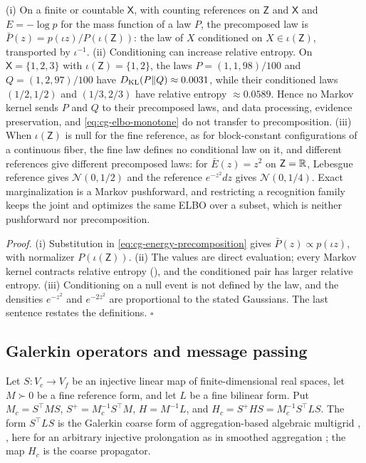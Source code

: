 (i) On a finite or countable $\mathsf X$, with counting references on $\mathsf Z$ and $\mathsf X$
and $E=-\log p$ for the mass function of a law $P$, the precomposed law is
$\bar P(z)=p(\iota z)/P(\iota(\mathsf Z))$: the law of $X$ conditioned on $X\in\iota(\mathsf Z)$,
transported by $\iota^{-1}$. (ii) Conditioning can increase relative entropy. On
$\mathsf X=\{1,2,3\}$ with $\iota(\mathsf Z)=\{1,2\}$, the laws $P=(1,1,98)/100$ and
$Q=(1,2,97)/100$ have $D_{\mathrm{KL}}(P\Vert Q)\approx0.0031$, while their conditioned laws $(1/2,1/2)$ and
$(1/3,2/3)$ have relative entropy $\approx0.0589$. Hence no Markov kernel sends $P$ and $Q$ to their
precomposed laws, and data processing, evidence preservation, and \eqref{eq:cg-elbo-monotone} do not
transfer to precomposition. (iii) When $\iota(\mathsf Z)$ is null for the fine reference, as for
block-constant configurations of a continuous fiber, the fine law defines no conditional law on it,
and different references give different precomposed laws: for $\bar E(z)=z^2$ on $\mathsf Z=\mathbb R$,
Lebesgue reference gives $\mathcal N(0,1/2)$ and the reference $e^{-z^2}dz$ gives
$\mathcal N(0,1/4)$. Exact marginalization is a Markov pushforward, and restricting a recognition
family keeps the joint and optimizes the same ELBO over a subset, which is neither pushforward nor
precomposition. 

\noindent\emph{Proof.}
(i) Substitution in \eqref{eq:cg-energy-precomposition} gives $\bar P(z)\propto p(\iota z)$, with
normalizer $P(\iota(\mathsf Z))$. (ii) The values are direct evaluation; every Markov kernel
contracts relative entropy (), and the conditioned pair has larger
relative entropy. (iii) Conditioning on a null event is not defined by the law, and the densities
$e^{-z^2}$ and $e^{-2z^2}$ are proportional to the stated Gaussians. The last sentence restates the
definitions. $\square$

\subsection{Galerkin operators and message passing}
\label{sec:cg-galerkin}

\label{eq:cg-galerkin-data}
Let $S:V_c\to V_f$ be an injective linear map of finite-dimensional real spaces, let $M\succ0$ be a
fine reference form, and let $L$ be a fine bilinear form. Put $M_c=S^\top MS$,
$S^+=M_c^{-1}S^\top M$, $H=M^{-1}L$, and $H_c=S^+HS=M_c^{-1}S^\top LS$. The form $S^\top LS$
is the Galerkin coarse form of aggregation-based algebraic multigrid
\citep[Eqs.~(2.1) and (2.2)]{Notay2010Aggregation}, \citep[Sec.~2]{LivneBrandt2012LAMG}, here for
an arbitrary injective prolongation as in smoothed aggregation \citep{VanekMandelBrezina1996}; the
map $H_c$ is the coarse propagator.


